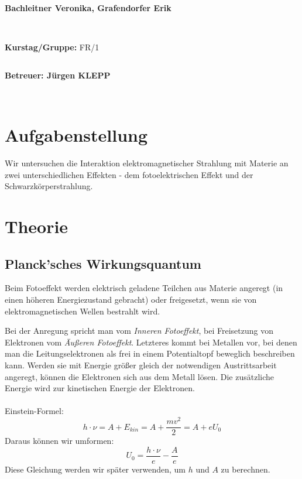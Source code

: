 \documentclass[12pt,a4paper,twopage]{article}
\begin{document}
\begin{verbatim}
\end{verbatim}
		\begin{flushleft}
			\textbf{\Large{Bachleitner Veronika, Grafendorfer Erik}} 
			\end{flushleft}

\begin{verbatim}


\end{verbatim}
			\begin{flushleft}
			\textbf{\Large{Kurstag/Gruppe:}} \Large{FR/1}
			\end{flushleft}

\begin{verbatim}

\end{verbatim}
			\begin{flushleft}
			\LARGE{\textbf{Betreuer:\Large{ Jürgen KLEPP }}}		
			\end{flushleft}
\newpage
\begin{verbatim}


\end{verbatim}
			
\section{Aufgabenstellung}
Wir untersuchen die Interaktion elektromagnetischer Strahlung mit Materie an zwei unterschiedlichen Effekten - dem fotoelektrischen Effekt und der Schwarzkörperstrahlung.
\section{Theorie}
\subsection{Planck'sches Wirkungsquantum}
Beim Fotoeffekt werden elektrisch geladene Teilchen aus Materie angeregt (in einen höheren Energiezustand gebracht) oder freigesetzt, wenn sie von elektromagnetischen Wellen bestrahlt wird. 

Bei der Anregung spricht man vom \textit{Inneren Fotoeffekt}, bei Freisetzung von Elektronen vom \textit{Äußeren Fotoeffekt}. Letzteres kommt bei Metallen vor, bei denen man die Leitungselektronen als frei in einem Potentialtopf beweglich beschreiben kann. Werden sie mit Energie größer gleich der notwendigen Austrittsarbeit angeregt, können die Elektronen sich aus dem Metall lösen. Die zusätzliche Energie wird zur kinetischen Energie der Elektronen.\\
\\
Einstein-Formel:
$$h\cdot\nu=A+E_{kin}=A+\frac{mv^2}{2}=A+eU_0$$
Daraus können wir umformen:
$$U_0=\frac{h\cdot\nu}{e} - \frac{A}{e}$$
Diese Gleichung werden wir später verwenden, um $h$ und $A$ zu berechnen.
\end{document}
